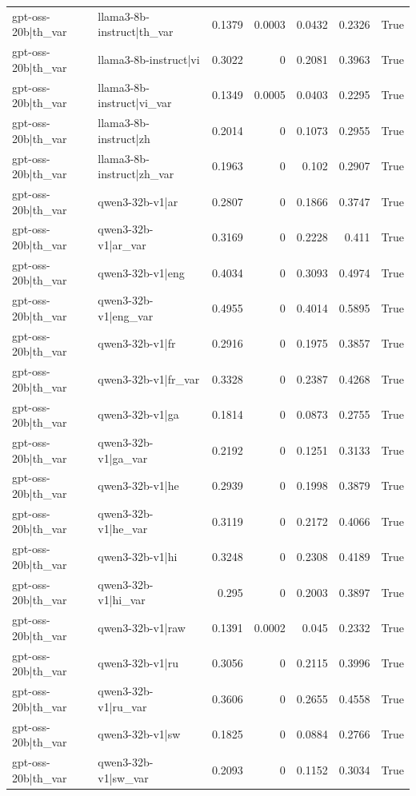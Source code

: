 \begin{table}
\begin{tabular}{l l r r r r l}
gpt-oss-20b|th_var & llama3-8b-instruct|th_var & 0.1379 & 0.0003 & 0.0432 & 0.2326 & True \\
gpt-oss-20b|th_var & llama3-8b-instruct|vi & 0.3022 & 0 & 0.2081 & 0.3963 & True \\
gpt-oss-20b|th_var & llama3-8b-instruct|vi_var & 0.1349 & 0.0005 & 0.0403 & 0.2295 & True \\
gpt-oss-20b|th_var & llama3-8b-instruct|zh & 0.2014 & 0 & 0.1073 & 0.2955 & True \\
gpt-oss-20b|th_var & llama3-8b-instruct|zh_var & 0.1963 & 0 & 0.102 & 0.2907 & True \\
gpt-oss-20b|th_var & qwen3-32b-v1|ar & 0.2807 & 0 & 0.1866 & 0.3747 & True \\
gpt-oss-20b|th_var & qwen3-32b-v1|ar_var & 0.3169 & 0 & 0.2228 & 0.411 & True \\
gpt-oss-20b|th_var & qwen3-32b-v1|eng & 0.4034 & 0 & 0.3093 & 0.4974 & True \\
gpt-oss-20b|th_var & qwen3-32b-v1|eng_var & 0.4955 & 0 & 0.4014 & 0.5895 & True \\
gpt-oss-20b|th_var & qwen3-32b-v1|fr & 0.2916 & 0 & 0.1975 & 0.3857 & True \\
gpt-oss-20b|th_var & qwen3-32b-v1|fr_var & 0.3328 & 0 & 0.2387 & 0.4268 & True \\
gpt-oss-20b|th_var & qwen3-32b-v1|ga & 0.1814 & 0 & 0.0873 & 0.2755 & True \\
gpt-oss-20b|th_var & qwen3-32b-v1|ga_var & 0.2192 & 0 & 0.1251 & 0.3133 & True \\
gpt-oss-20b|th_var & qwen3-32b-v1|he & 0.2939 & 0 & 0.1998 & 0.3879 & True \\
gpt-oss-20b|th_var & qwen3-32b-v1|he_var & 0.3119 & 0 & 0.2172 & 0.4066 & True \\
gpt-oss-20b|th_var & qwen3-32b-v1|hi & 0.3248 & 0 & 0.2308 & 0.4189 & True \\
gpt-oss-20b|th_var & qwen3-32b-v1|hi_var & 0.295 & 0 & 0.2003 & 0.3897 & True \\
gpt-oss-20b|th_var & qwen3-32b-v1|raw & 0.1391 & 0.0002 & 0.045 & 0.2332 & True \\
gpt-oss-20b|th_var & qwen3-32b-v1|ru & 0.3056 & 0 & 0.2115 & 0.3996 & True \\
gpt-oss-20b|th_var & qwen3-32b-v1|ru_var & 0.3606 & 0 & 0.2655 & 0.4558 & True \\
gpt-oss-20b|th_var & qwen3-32b-v1|sw & 0.1825 & 0 & 0.0884 & 0.2766 & True \\
gpt-oss-20b|th_var & qwen3-32b-v1|sw_var & 0.2093 & 0 & 0.1152 & 0.3034 & True \\

\end{tabular}
\end{table}
